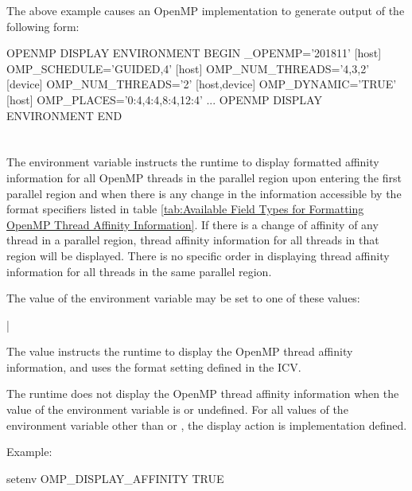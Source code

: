 The above example causes an OpenMP implementation to generate output of the
following form:

\begin{ompEnv}
OPENMP DISPLAY ENVIRONMENT BEGIN
  _OPENMP='201811'
  [host] OMP_SCHEDULE='GUIDED,4'
  [host] OMP_NUM_THREADS='4,3,2'
  [device] OMP_NUM_THREADS='2'
  [host,device] OMP_DYNAMIC='TRUE'
  [host] OMP_PLACES='{0:4},{4:4},{8:4},{12:4}'
  ...
OPENMP DISPLAY ENVIRONMENT END
\end{ompEnv}


\section{}
\label{sec:OMP_DISPLAY_AFFINITY}
The  environment variable instructs the runtime to
display formatted affinity information for all OpenMP threads in the parallel
region upon entering the first parallel region and when there is any change in
the information accessible by the format specifiers listed in table
\ref{tab:Available Field Types for Formatting OpenMP Thread Affinity Information}.
If there is a change of affinity of any thread in a parallel region, thread
affinity information for all threads in that region will be displayed.
There is no specific order in displaying thread affinity information for all
threads in the same parallel region.

The value of the  environment variable may be set to one of these
values:

{|}


The  value instructs the runtime to display the OpenMP thread affinity information, and uses the
format setting defined in the  ICV.

The runtime does not display the OpenMP thread affinity information when the value of the 
environment variable is  or undefined. For all values of the environment
variable other than  or , the display action is implementation defined.

Example:
\begin{ompEnv}
setenv OMP_DISPLAY_AFFINITY TRUE
\end{ompEnv}

